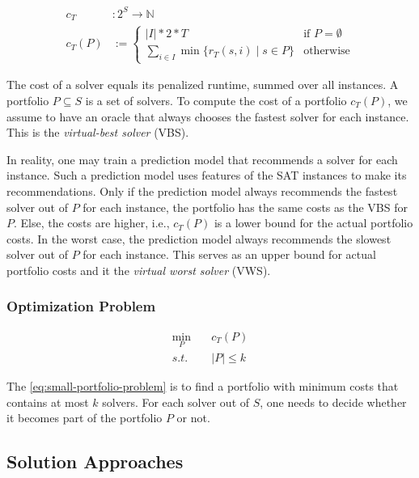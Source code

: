 \documentclass[conference]{IEEEtran}
\begin{document}
\begin{align*}
	c_{T} &: 2^S \rightarrow \mathbb{N}\\
	c_{T}(P) &:= \begin{cases}
		|I|*2*T & \text{if }P=\emptyset\\
		\sum_{i \in I}{\min\{r_T(s,i) \mid s \in P\}} & \text{otherwise}
	\end{cases} \tag*{Portfolio Cost}
\end{align*}

The cost of a solver equals its penalized runtime, summed over all instances.
A portfolio $P \subseteq S$ is a set of solvers.
To compute the cost of a portfolio $c_{T}(P)$, we assume to have an oracle that always chooses the fastest solver for each instance.
This is the \emph{virtual-best solver} (VBS).

In reality, one may train a prediction model that recommends a solver for each instance.
Such a prediction model uses features of the SAT instances to make its recommendations.
Only if the prediction model always recommends the fastest solver out of $P$ for each instance, the portfolio has the same costs as the VBS for $P$.
Else, the costs are higher, i.e., $c_{T}(P)$ is a lower bound for the actual portfolio costs.
In the worst case, the prediction model always recommends the slowest solver out of $P$ for each instance.
This serves as an upper bound for actual portfolio costs and it the \emph{virtual worst solver} (VWS).

\subsubsection{Optimization Problem}

\begin{equation}
	\label{eq:small-portfolio-problem}
	\begin{aligned}
		\min_P \quad & c_{T}(P)\\
		s.t. \quad & |P| \leq k
	\end{aligned}
   \tag{Small-Portfolio Problem}
\end{equation}

The \ref{eq:small-portfolio-problem} is to find a portfolio with minimum costs that contains at most $k$ solvers.
For each solver out of $S$, one needs to decide whether it becomes part of the portfolio $P$ or not.

\subsection{Solution Approaches}
\label{sec:approach:solution}
\end{document}
